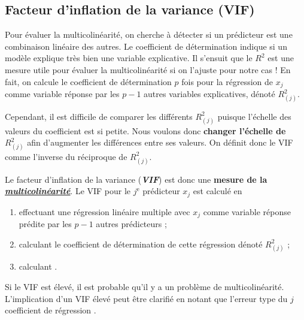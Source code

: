 \documentclass[french]{article}
\begin{document}
\begin{multicols*}{2}
\columnbreak
\subsection{Facteur d'inflation de la variance (VIF)}
\begin{rappel_enhanced}[Motivation]
Pour évaluer la multicolinéarité, on cherche à détecter si un prédicteur est une combinaison linéaire des autres. Le coefficient de détermination indique si un modèle explique très bien une variable explicative. Il s'ensuit que le $R^{2}$ est une mesure utile pour évaluer la multicolinéarité si on l'ajuste pour notre cas ! En fait, on calcule le coefficient de détermination $p$ fois pour la régression de $x_{j}$ comme variable réponse par les $p - 1$ autres variables explicatives, dénoté $R^{2}_{(j)}$.

\bigskip

Cependant, il est difficile de comparer les différents $R^{2}_{(j)}$ puisque l'échelle des valeurs du coefficient est si petite. Nous voulons donc \textbf{changer l'échelle de $R^{2}_{(j)}$} afin d'augmenter les différences entre ses valeurs. On définit donc le VIF comme l'inverse du réciproque de $R^{2}_{(j)}$.
\end{rappel_enhanced}


\begin{definitionNOHFILL}
Le facteur d'inflation de la variance (\textbf{\textit{VIF}}) est donc une \textbf{mesure de la \textit{\color{bleudefrance}\underline{\hyperlink{multicolin}{\color{bleudefrance} multicolinéarité}}}}. Le VIF pour le $j^{\text{e}}$ prédicteur $x_{j}$ est calculé en
\begin{enumerate}[label = \circled{\arabic*}{trueblue}]
	\item	effectuant une régression linéaire multiple avec $x_{j}$ comme variable réponse prédite par les $p - 1$ autres prédicteurs ;
	\item	calculant le coefficient de détermination de cette régression dénoté $R^{2}_{(j)}$ ;
	\item	calculant .
\end{enumerate}

\bigskip

Si le VIF est élevé, il est probable qu'il y a un problème de multicolinéarité. L'implication d'un VIF élevé peut être clarifié en notant que l'erreur type du $j$ coefficient de régression . 


\end{definitionNOHFILL}
\end{multicols*}
\end{document}
